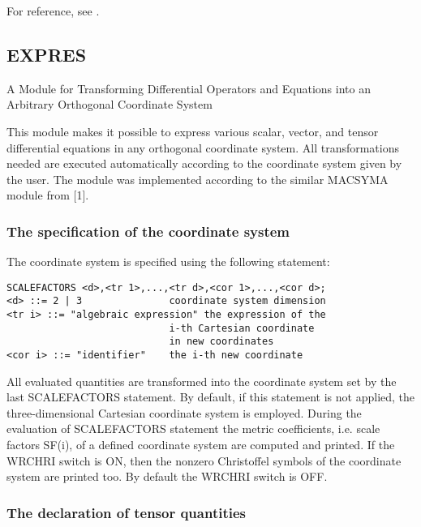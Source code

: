 For reference, see \cite{Liska:90}.



\subsection{EXPRES}




                A Module for Transforming Differential
         Operators and Equations into an Arbitrary Orthogonal
                           Coordinate System



     This module  makes it  possible to  express various scalar, vector,
and tensor differential equations  in any  orthogonal coordinate system.
All transformations  needed are  executed automatically according to the
coordinate  system  given  by  the  user.  The  module  was  implemented
according to the similar MACSYMA module from [1].


\subsubsection{The specification of the coordinate system}

The coordinate system is specified using the following statement:
\begin{verbatim}
SCALEFACTORS <d>,<tr 1>,...,<tr d>,<cor 1>,...,<cor d>;
<d> ::= 2 | 3               coordinate system dimension
<tr i> ::= "algebraic expression" the expression of the
                            i-th Cartesian coordinate
                            in new coordinates
<cor i> ::= "identifier"    the i-th new coordinate
\end{verbatim}
All evaluated  quantities are transformed into the coordinate system set
by the last SCALEFACTORS statement. By default, if this statement is not
applied, the  three-dimensional Cartesian coordinate system is employed.
During the evaluation of SCALEFACTORS statement the metric coefficients,
i.e. scale  factors SF(i),  of a  defined coordinate system are computed
and printed. If the WRCHRI switch  is ON,  then the  nonzero Christoffel
symbols of the coordinate system are printed too. By  default the WRCHRI
switch is OFF.

\subsubsection{The declaration of tensor quantities}


